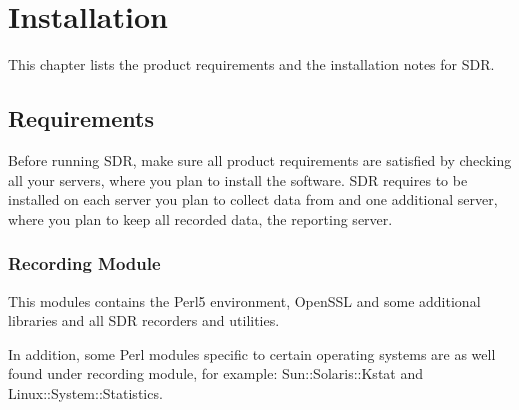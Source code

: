 \chapter{Installation}
\noindent
This chapter lists the product requirements and the installation
notes for SDR.

\section{Requirements}
\noindent
Before running SDR, make sure all product requirements
are satisfied by checking all your servers, where
you plan to install the software. SDR requires to be installed 
on each server you plan to collect data from and one additional 
server, where you plan to keep all recorded data, the reporting server.

\subsection*{Recording Module}
This modules contains the Perl5 environment, OpenSSL and some
additional libraries and all SDR recorders and utilities.

In addition, some Perl modules specific to certain operating systems are as well 
found under recording module, for example: Sun::Solaris::Kstat and
Linux::System::Statistics.

